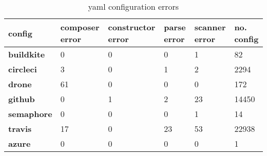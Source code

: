 \begin {table}[!htbp]

\caption{yaml configuration errors}
\label{table_yaml_errors}
\begin{tabular}{|l|l|l|l|l|l|}
\hline
\textbf{config} &  composer error &  constructor error &  parse error &  scanner error &  no. config \\ \hline

\textbf{buildkite} &               0 &                  0 &            0 &              1 &          82 \\ \hline
\textbf{circleci } &               3 &                  0 &            1 &              2 &        2294 \\ \hline
\textbf{drone    } &              61 &                  0 &            0 &              0 &         172 \\ \hline
\textbf{github   } &               0 &                  1 &            2 &             23 &       14450 \\ \hline
\textbf{semaphore} &               0 &                  0 &            0 &              1 &          14 \\ \hline
\textbf{travis   } &              17 &                  0 &           23 &             53 &       22938 \\ \hline
\textbf{azure    } &               0 &                  0 &            0 &              0 &           1 \\ \hline

\end{tabular}
\end{table}
